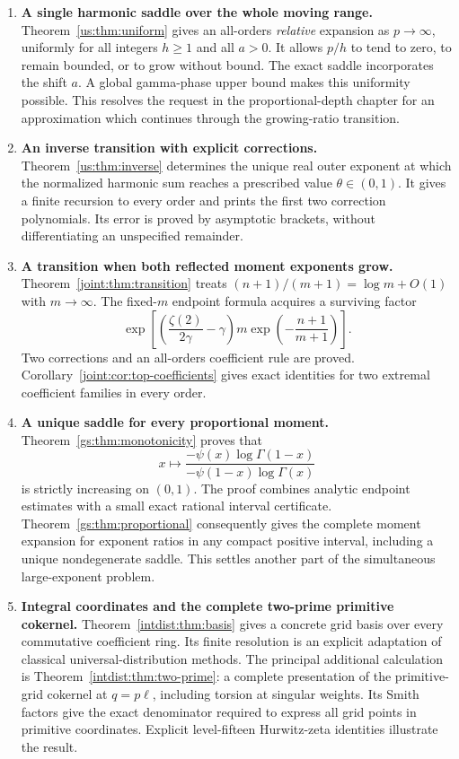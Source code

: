 \begin{enumerate}[leftmargin=*,label=\arabic*.]
\item \textbf{A single harmonic saddle over the whole moving range.}
Theorem~\ref{us:thm:uniform} gives an all-orders \emph{relative}
expansion as $p\to\infty$, uniformly for all integers $h\ge1$ and
all $a>0$. It allows $p/h$ to tend to zero, to remain bounded, or to
grow without bound. The exact saddle incorporates the shift $a$.
A global gamma-phase upper bound makes this uniformity possible.
This resolves the request in the proportional-depth chapter for an
approximation which continues through the growing-ratio transition.

\item \textbf{An inverse transition with explicit corrections.}
Theorem~\ref{us:thm:inverse} determines the unique real outer exponent
at which the normalized harmonic sum reaches a prescribed value
$\theta\in(0,1)$. It gives a finite recursion to every order and
prints the first two correction polynomials. Its error is proved by
asymptotic brackets, without differentiating an unspecified remainder.

\item \textbf{A transition when both reflected moment exponents grow.}
Theorem~\ref{joint:thm:transition} treats
$(n+1)/(m+1)=\log m+O(1)$ with $m\to\infty$. The fixed-$m$
endpoint formula acquires a surviving factor
\[
 \exp\!\left[\left(\frac{\zeta(2)}{2\gamma}-\gamma\right)
       m\exp\!\left(-\frac{n+1}{m+1}\right)\right].
\]
Two corrections and an all-orders coefficient rule are proved.
Corollary~\ref{joint:cor:top-coefficients} gives exact identities for
two extremal coefficient families in every order.

\item \textbf{A unique saddle for every proportional moment.}
Theorem~\ref{gs:thm:monotonicity} proves that
\[
 x\longmapsto
 \frac{-\psi(x)\log\Gamma(1-x)}
      {-\psi(1-x)\log\Gamma(x)}
\]
is strictly increasing on $(0,1)$. The proof combines analytic
endpoint estimates with a small exact rational interval certificate.
Theorem~\ref{gs:thm:proportional} consequently gives the complete
moment expansion for exponent ratios in any compact positive
interval, including a unique nondegenerate saddle. This settles
another part of the simultaneous large-exponent problem.

\item \textbf{Integral coordinates and the complete two-prime
primitive cokernel.} Theorem~\ref{intdist:thm:basis} gives a concrete
grid basis over every commutative coefficient ring. Its finite
resolution is an explicit adaptation of classical universal-distribution
methods. The principal additional calculation is
Theorem~\ref{intdist:thm:two-prime}: a complete presentation of the
primitive-grid cokernel at $q=p\ell$, including torsion at singular
weights. Its Smith factors give the exact denominator required to
express all grid points in primitive coordinates. Explicit level-fifteen
Hurwitz-zeta identities illustrate the result.


\end{enumerate}
